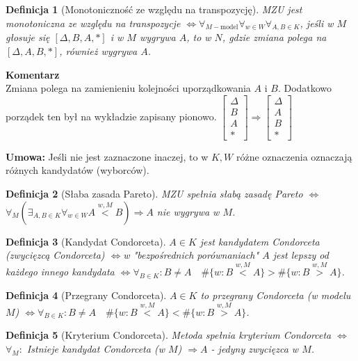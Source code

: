 \documentclass[12pt,a4paper]{article}
\theoremstyle{break}
\newcommand{\Komentarz}[1]{
	\begin{mdframed}[style=zadanie]
		\textbf{Komentarz}\\
		#1
	\end{mdframed}
	}
\newtheorem{definition}{Definicja}[section]
\newcommand{\witw}{$\Leftrightarrow$}
\begin{document}
		\begin{definition}[Monotoniczność ze względu na transpozycję]
			MZU jest monotoniczna ze względu na transpozycje \witw $\forall_{M-\text{model}} \forall_{w\in W} \forall_{A,B\in K}$, jeśli w $M$ głosuje się $[\Delta, B, A, *]$ i w $M$ wygrywa $A$, to w $N$, gdzie zmiana polega na $[\Delta, A, B, *]$, również wygrywa $A$.
		\end{definition}
		
		\Komentarz{Zmiana polega na zamienieniu kolejności uporządkowania $A$ i $B$. Dodatkowo porządek ten był na wykładzie zapisany pionowo. $\begin{bmatrix}
				\Delta\\
				B\\
				A\\
				*
			\end{bmatrix} \Rightarrow \begin{bmatrix}
			\Delta\\
			A\\
			B\\
			*
		\end{bmatrix}$
		}
		
		{\textbf{Umowa:}} Jeśli nie jest zaznaczone inaczej, to w $K,W$ różne oznaczenia oznaczają różnych kandydatów (wyborców).
		
		\begin{definition}[Słaba zasada Pareto]
			MZU spełnia słabą zasadę Pareto \witw $\forall_M (\exists_{A,B\in K}\forall_{w\in W} A\overset{w,M}{<}B) \Rightarrow A$ nie wygrywa w $M$.
		\end{definition}
		
		\begin{definition}[Kandydat Condorceta]
			$A\in K$ jest kandydatem Condorceta (zwycięzcą Condorceta) \witw w "bezpośrednich porównaniach" $A$ jest lepszy od każdego innego kandydata \witw $\forall_{B \in K}: B\neq A \quad \#\{w: B\overset{w,M}{<}A\}>\#\{w: B\overset{w,M}{>}A\}$.
		\end{definition}
		
		\begin{definition}[Przegrany Condorceta]
			$A\in K$ to przegrany Condorceta (w modelu $M$) \witw $\forall_{B \in K}: B\neq A \quad\#\{w: B\overset{w,M}{<}A\}<\#\{w: B\overset{w,M}{>}A\}$.
		\end{definition}
		
		\begin{definition}[Kryterium Condorceta]
			Metoda spełnia kryterium Condorceta \witw $\forall_M:$ Istnieje kandydat Condorceta (w $M$) $\Rightarrow A$ - jedyny zwycięzca w $M$.
		\end{definition}
		
\end{document}
